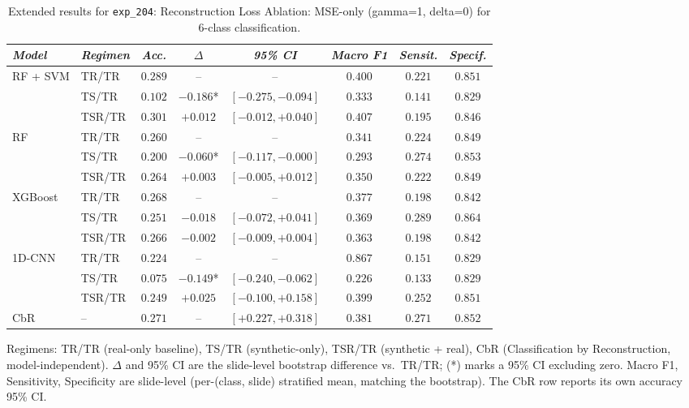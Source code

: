 \begin{table}[htp]
\centering
\scriptsize
\caption{Extended results for \texttt{exp\_204}: Reconstruction Loss Ablation: MSE-only (gamma=1, delta=0) for 6-class classification.}
\label{tab:appendix_exp_204}
\begin{tabular*}{\textwidth}{@{\extracolsep{\fill}}llcccccc}
\toprule
\emph{Model} & \emph{Regimen} & \emph{Acc.} & \emph{$\Delta$} & \emph{95\% CI} & \emph{Macro F1} & \emph{Sensit.} & \emph{Specif.}\\
\midrule
\multirow{3}{*}{RF + SVM} & TR/TR & $0.289$ & -- & -- & $0.400$ & $0.221$ & $0.851$\\
 & TS/TR & $0.102$ & $-0.186$* & $[-0.275, -0.094]$ & $0.333$ & $0.141$ & $0.829$\\
 & TSR/TR & $0.301$ & $+0.012$ & $[-0.012, +0.040]$ & $0.407$ & $0.195$ & $0.846$\\
\midrule
\multirow{3}{*}{RF} & TR/TR & $0.260$ & -- & -- & $0.341$ & $0.224$ & $0.849$\\
 & TS/TR & $0.200$ & $-0.060$* & $[-0.117, -0.000]$ & $0.293$ & $0.274$ & $0.853$\\
 & TSR/TR & $0.264$ & $+0.003$ & $[-0.005, +0.012]$ & $0.350$ & $0.222$ & $0.849$\\
\midrule
\multirow{3}{*}{XGBoost} & TR/TR & $0.268$ & -- & -- & $0.377$ & $0.198$ & $0.842$\\
 & TS/TR & $0.251$ & $-0.018$ & $[-0.072, +0.041]$ & $0.369$ & $0.289$ & $0.864$\\
 & TSR/TR & $0.266$ & $-0.002$ & $[-0.009, +0.004]$ & $0.363$ & $0.198$ & $0.842$\\
\midrule
\multirow{3}{*}{1D-CNN} & TR/TR & $0.224$ & -- & -- & $0.867$ & $0.151$ & $0.829$\\
 & TS/TR & $0.075$ & $-0.149$* & $[-0.240, -0.062]$ & $0.226$ & $0.133$ & $0.829$\\
 & TSR/TR & $0.249$ & $+0.025$ & $[-0.100, +0.158]$ & $0.399$ & $0.252$ & $0.851$\\
\midrule
CbR & -- & $0.271$ & -- & $[+0.227, +0.318]$ & $0.381$ & $0.271$ & $0.852$\\
\bottomrule
\end{tabular*}
\small{Regimens: TR/TR (real-only baseline), TS/TR (synthetic-only), TSR/TR (synthetic + real), CbR (Classification by Reconstruction, model-independent). $\Delta$ and 95\% CI are the slide-level bootstrap difference vs.\ TR/TR; (*) marks a 95\% CI excluding zero. Macro F1, Sensitivity, Specificity are slide-level (per-(class, slide) stratified mean, matching the bootstrap). The CbR row reports its own accuracy 95\% CI.}
\end{table}

